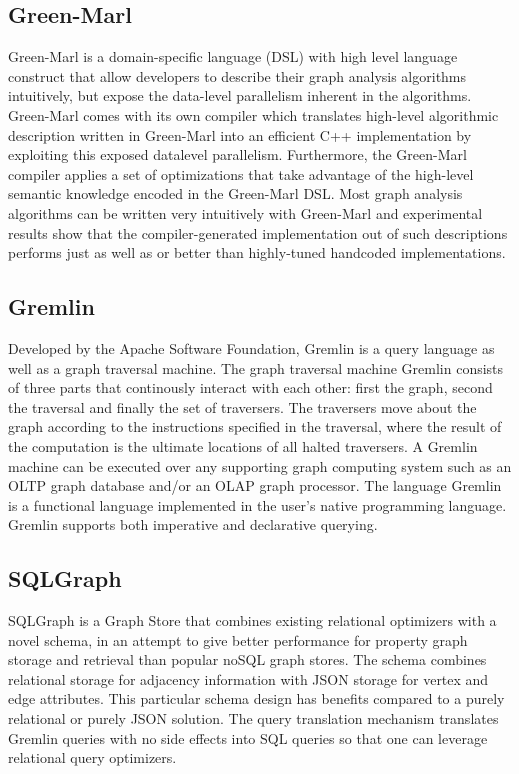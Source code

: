\documentclass[11pt,singlecolumn]{scrartcl}
\begin{document}
\clearpage

\subsection{Green-Marl}
Green-Marl is a domain-specific language (DSL) with high level language construct that allow developers to describe their graph analysis algorithms intuitively, but expose the data-level parallelism inherent in the algorithms. Green-Marl comes with its own compiler which translates high-level algorithmic description written in Green-Marl into an efficient C++ implementation by exploiting this exposed datalevel parallelism. Furthermore, the Green-Marl compiler applies a set of optimizations that take advantage of the high-level semantic knowledge encoded in the Green-Marl DSL. Most graph analysis algorithms can be written very intuitively with Green-Marl and experimental results show that the compiler-generated implementation out of such descriptions performs just as well as or better than highly-tuned handcoded implementations.\cite {Greenmarl}

\clearpage

\subsection{Gremlin}
Developed by the Apache Software Foundation, Gremlin is a query language as well as a graph traversal machine. The graph traversal machine Gremlin consists of three parts that continously interact with each other: first the graph, second the traversal and finally the set of traversers. The traversers move about the graph according to the instructions specified in the traversal, where the result of the computation is the ultimate locations of all halted traversers. A Gremlin machine can be executed over any supporting graph computing system such as an OLTP graph database and/or an OLAP graph processor. The language Gremlin is a functional language implemented in the user’s native programming language. Gremlin supports both imperative and declarative querying.
\cite{Gremlin}

\clearpage

\subsection{SQLGraph}
SQLGraph is a Graph Store that combines existing relational optimizers with a novel schema, in an attempt to give better performance for property graph storage and retrieval than popular noSQL graph stores. The schema combines relational storage for adjacency information with JSON storage for vertex and edge attributes. This particular schema design has benefits compared to a purely relational or purely JSON solution. The query translation mechanism translates Gremlin queries with no side effects into SQL queries so that one can leverage relational query optimizers. \cite{Sun:2015}
\end{document}
